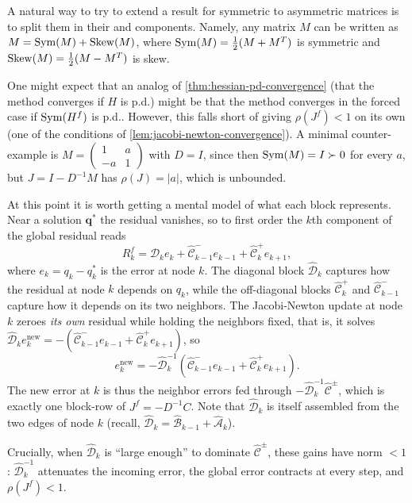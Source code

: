 A natural way to try to extend a result for symmetric to asymmetric matrices is to split them in their  and  components. Namely, any matrix $M$ can be written as $M = \operatorname{Sym}(M) + \operatorname{Skew}(M)$, where $\operatorname{Sym}(M) = \tfrac{1}{2}(M + M^T)$ is symmetric and $\operatorname{Skew}(M) = \tfrac{1}{2}(M - M^T)$ is skew.

One might expect that an analog of \cref{thm:hessian-pd-convergence} (that the method converges if $H$ is p.d.) might be that the method converges in the forced case if $\operatorname{Sym}(H^f)$ is p.d.. However, this falls short of giving $\rho(J^f) < 1$ on its own (one of the conditions of \cref{lem:jacobi-newton-convergence}). A minimal counter-example is $M = \left(\begin{smallmatrix}1 & a \\ -a & 1\end{smallmatrix}\right)$ with $D = I$, since then $\operatorname{Sym}(M) = I \succ 0$ for every $a$, but $J = I - D^{-1}M$ has $\rho(J) = |a|$, which is unbounded.

At this point it is worth getting a mental model of what each block represents. Near a solution $\mathbf{q}^*$ the residual vanishes, so to first order the $k$th component of the global residual reads
\[
	R_k^f = \hat{\mathcal{D}}_k e_k + \hat{\mathcal{C}}^-_{k-1} e_{k-1} + \hat{\mathcal{C}}^+_k e_{k+1},
\]
where $e_k = q_k - q_k^*$ is the error at node $k$. The diagonal block $\hat{\mathcal{D}}_k$ captures how the residual at node $k$ depends on $q_k$, while the off-diagonal blocks $\hat{\mathcal{C}}^+_k$ and $\hat{\mathcal{C}}^-_{k-1}$ capture how it depends on its two neighbors. The Jacobi-Newton update at node $k$ zeroes \emph{its own} residual while holding the neighbors fixed, that is, it solves $\hat{\mathcal{D}}_k e_k^{\text{new}} = -(\hat{\mathcal{C}}^-_{k-1} e_{k-1} + \hat{\mathcal{C}}^+_k e_{k+1})$, so
\[
	e_k^{\text{new}} = -\hat{\mathcal{D}}_k^{-1}\left(\hat{\mathcal{C}}^-_{k-1} e_{k-1} + \hat{\mathcal{C}}^+_k e_{k+1}\right).
\]
The new error at $k$ is thus the neighbor errors fed through $-\hat{\mathcal{D}}_k^{-1}\hat{\mathcal{C}}^\pm$, which is exactly one block-row of $J^f = -D^{-1}C$. Note that $\hat{\mathcal{D}}_k$ is itself assembled from the two edges of node $k$ (recall, $\hat{\mathcal{D}}_k = \hat{\mathcal{B}}_{k-1} + \hat{\mathcal{A}}_k$).

Crucially, when $\hat{\mathcal{D}}_k$ is ``large enough'' to dominate $\hat{\mathcal{C}}^\pm$, these gains have norm $<1$: $\hat{\mathcal{D}}_k^{-1}$ attenuates the incoming error, the global error contracts at every step, and $\rho(J^f) < 1$.


